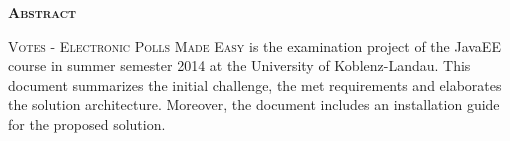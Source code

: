 \vspace*{\fill}
\begin{center}
{\huge\textsc{\textbf{Abstract}}}
\\ \vspace*{7mm}
\begin{minipage}[m]{0.9\textwidth}
\large
\textsc{Votes - Electronic Polls Made Easy} is the examination project of the JavaEE course in summer semester 2014 at the University of Koblenz-Landau.
This document summarizes the initial challenge, the met requirements and elaborates the solution architecture.
Moreover, the document includes an installation guide for the proposed solution.
\end{minipage}
\end{center}
\vspace*{\fill}